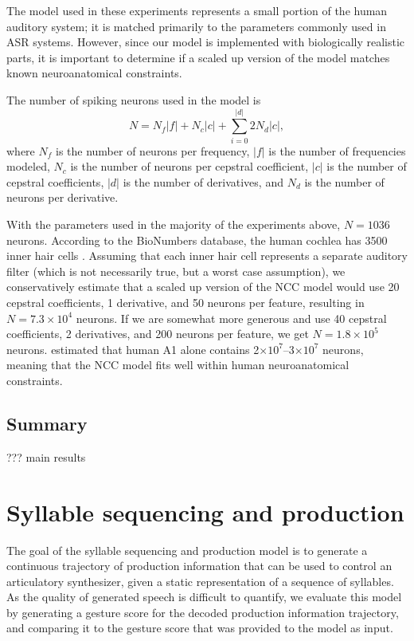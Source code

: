 The model used in these experiments
represents a small portion
of the human auditory system;
it is matched primarily to the parameters
commonly used in ASR systems.
However, since our model is
implemented with biologically realistic parts,
it is important to determine
if a scaled up version of the model
matches known neuroanatomical constraints.

The number of spiking neurons used
in the model is
\begin{equation}
  N = N_f |f| + N_c |c| + \sum_{i=0}^{|d|} 2 N_d |c|,
\end{equation}
where $N_f$ is the number of neurons per frequency,
$|f|$ is the number of frequencies modeled,
$N_c$ is the number of neurons per cepstral coefficient,
$|c|$ is the number of cepstral coefficients,
$|d|$ is the number of derivatives,
and $N_d$ is the number of neurons per derivative.

With the parameters used
in the majority of the experiments above,
$N=1036$ neurons.
According to the BioNumbers database,
the human cochlea has 3500 inner hair cells
\cite[BNID~100697]{milo2010}.
Assuming that each inner hair cell
represents a separate auditory filter
(which is not necessarily true,
but a worst case assumption),
we conservatively estimate
that a scaled up version
of the NCC model
would use 20 cepstral coefficients,
1 derivative, and 50 neurons per feature,
resulting in $N=7.3 \times 10^4$ neurons.
If we are somewhat more generous
and use 40 cepstral coefficients,
2 derivatives, and 200 neurons per feature,
we get $N=1.8 \times 10^5$ neurons.
\cite{smiley2013} estimated
that human A1 alone contains
2$\times 10^7$--3$\times 10^7$ neurons,
meaning that the NCC model
fits well within human neuroanatomical constraints.

\subsection{Summary}

??? main results

\section{Syllable sequencing and production}
\label{sec:results-production}

The goal of the syllable sequencing and production model
is to generate a continuous trajectory
of production information
that can be used to control
an articulatory synthesizer,
given a static representation
of a sequence of syllables.
As the quality of generated speech
is difficult to quantify,
we evaluate this model
by generating a gesture score
for the decoded production information trajectory,
and comparing it
to the gesture score that was provided
to the model as input.


